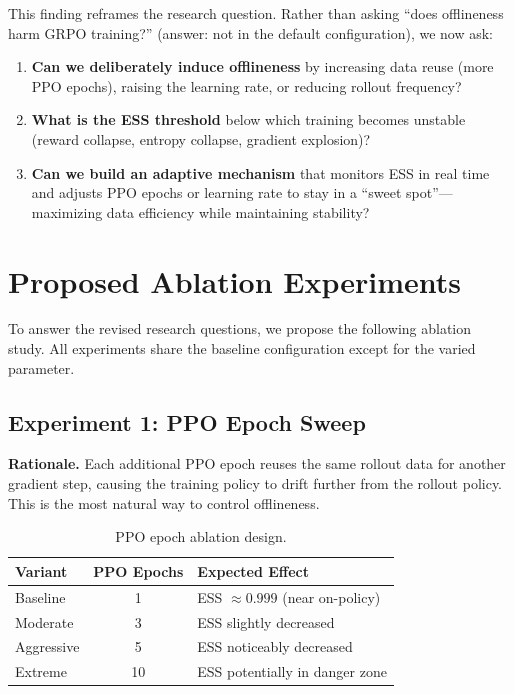 \documentclass[11pt,a4paper]{article}
\begin{document}
This finding reframes the research question. Rather than asking ``does
offlineness harm GRPO training?'' (answer: not in the default configuration), we
now ask:

\begin{enumerate}[leftmargin=*]
  \item \textbf{Can we deliberately induce offlineness} by increasing data reuse
    (more PPO epochs), raising the learning rate, or reducing rollout frequency?

  \item \textbf{What is the ESS threshold} below which training becomes unstable
    (reward collapse, entropy collapse, gradient explosion)?

  \item \textbf{Can we build an adaptive mechanism} that monitors ESS in real
    time and adjusts PPO epochs or learning rate to stay in a ``sweet spot''---
    maximizing data efficiency while maintaining stability?
\end{enumerate}


\section{Proposed Ablation Experiments}
\label{sec:ablations}

To answer the revised research questions, we propose the following ablation
study. All experiments share the baseline configuration except for the varied
parameter.

\subsection{Experiment 1: PPO Epoch Sweep}

\textbf{Rationale.} Each additional PPO epoch reuses the same rollout data for
another gradient step, causing the training policy to drift further from the
rollout policy. This is the most natural way to control offlineness.

\begin{table}[H]
\centering
\caption{PPO epoch ablation design.}
\label{tab:ppo_sweep}
\begin{tabular}{@{}lcl@{}}
\toprule
\textbf{Variant} & \textbf{PPO Epochs} & \textbf{Expected Effect} \\
\midrule
Baseline     & 1  & ESS $\approx 0.999$ (near on-policy) \\
Moderate     & 3  & ESS slightly decreased \\
Aggressive   & 5  & ESS noticeably decreased \\
Extreme      & 10 & ESS potentially in danger zone \\
\bottomrule
\end{tabular}
\end{table}
\end{document}
